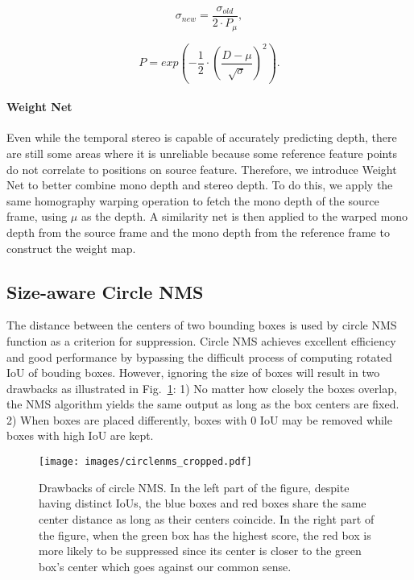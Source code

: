 \documentclass[letterpaper]{article} \usepackage[]{aaai23}  \usepackage{times}  \usepackage{helvet}  \usepackage{courier}  \usepackage[hyphens]{url}  \usepackage{graphicx} \urlstyle{rm} \def\UrlFont{\rm}  \usepackage{natbib}  \usepackage{caption} \frenchspacing  \setlength{\pdfpagewidth}{8.5in} \setlength{\pdfpageheight}{11in} \usepackage{algorithm}
\begin{document}
\begin{equation}
\label{equ: update-sigma}
    \sigma_{new} =  \frac{\sigma_{old}}{2 \cdot P_{\mu}},
\end{equation}

\begin{equation}
\label{equ: depth-map}
    P = exp(-\frac{1}{2} \cdot (\frac{D - \mu}{\sqrt{\sigma}})^2).
\end{equation}
\paragraph{Weight Net}
Even while the temporal stereo is capable of accurately predicting depth, there are still some areas where it is unreliable because some reference feature points do not correlate to positions on source feature. Therefore, we introduce Weight Net to better combine mono depth and stereo depth. To do this, we apply the same homography warping operation to fetch the mono depth of the source frame, using $\mu$ as the depth. A similarity net is then applied to the warped mono depth from the source frame and the mono depth from the reference frame to construct the weight map.

\subsection{Size-aware Circle NMS}
The distance between the centers of two bounding boxes is used by circle NMS ~\cite{yin2021center} function as a criterion for suppression. Circle NMS achieves excellent efficiency and good performance by bypassing the difficult process of computing rotated IoU of bouding boxes. However, ignoring the size of boxes will result in two drawbacks as illustrated in Fig.~\ref{fig:circle-nms}: 1) No matter how closely the boxes overlap, the NMS algorithm yields the same output as long as the box centers are fixed. 2) When boxes are placed differently, boxes with 0 IoU may be removed while boxes with high IoU are kept. 

\begin{figure}[t]
\texttt{[image: images/circlenms\_cropped.pdf]}
\centering
\caption{Drawbacks of circle NMS. In the left part of the figure, despite having distinct IoUs, the blue boxes and red boxes share the same center distance as long as their centers coincide. In the right part of the figure, when the green box has the highest score, the red box is more likely to be suppressed since its center is closer to the green box's center which goes against our common sense.}
\label{fig:circle-nms}
\end{figure}
\end{document}
